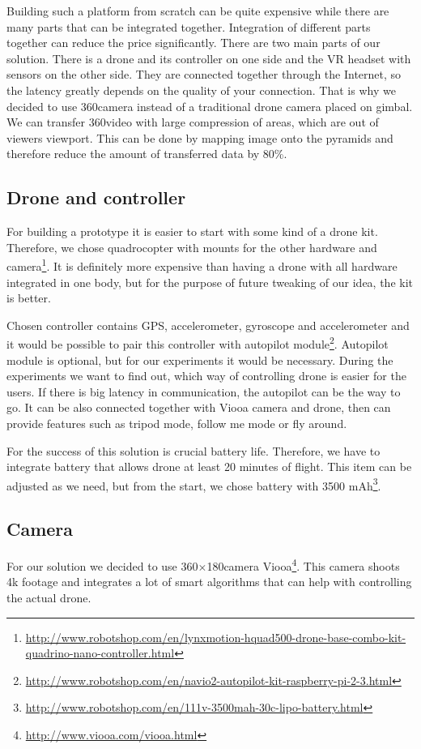 Building such a platform from scratch can be quite expensive while there are many parts that can be integrated together. Integration of different parts together can reduce the price significantly. There are two main parts of our solution. There is a drone and its controller on one side and the VR headset with sensors on the other side. They are connected together through the Internet, so the latency greatly depends on the quality of your connection. That is why we decided to use 360\degree camera instead of a traditional drone camera placed on gimbal. We can transfer 360\degree video with large compression of areas, which are out of viewers viewport. This can be done by mapping image onto the pyramids and therefore reduce the amount of transferred data by 80\%\cite{facebook2016videoencoding}.

\subsection{Drone and controller}
For building a prototype it is easier to start with some kind of a drone kit. Therefore, we chose quadrocopter with mounts for the other hardware and camera\footnote{\url{http://www.robotshop.com/en/lynxmotion-hquad500-drone-base-combo-kit-quadrino-nano-controller.html}}. It is definitely more expensive than having a drone with all hardware integrated in one body, but for the purpose of future tweaking of our idea, the kit is better. 

Chosen controller contains GPS, accelerometer, gyroscope and accelerometer and it would be possible to pair this controller with autopilot module\footnote{\url{http://www.robotshop.com/en/navio2-autopilot-kit-raspberry-pi-2-3.html}}. Autopilot module is optional, but for our experiments it would be necessary. During the experiments we want to find out, which way of controlling drone is easier for the users. If there is big latency in communication, the autopilot can be the way to go. It can be also connected together with Viooa camera and drone, then can provide features such as tripod mode, follow me mode or fly around.

For the success of this solution is crucial battery life. Therefore, we have to integrate battery that allows drone at least 20 minutes of flight. This item can be adjusted as we need, but from the start, we chose battery with 3500 mAh\footnote{\url{http://www.robotshop.com/en/111v-3500mah-30c-lipo-battery.html}}.

\subsection{Camera}
For our solution we decided to use 360\degree$\times$180\degree camera Viooa\footnote{\url{http://www.viooa.com/viooa.html}}. This camera shoots 4k footage and integrates a lot of smart algorithms that can help with controlling the actual drone.

